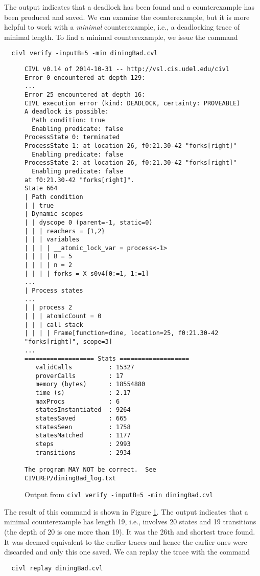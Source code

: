 The output indicates that a deadlock has been found and a
counterexample has been produced and saved. We can examine the
counterexample, but it is more helpful to work with a \emph{minimal}
counterexample, i.e., a deadlocking trace of minimal length. To find a
minimal counterexample, we issue the command

\begin{verbatim}
  civl verify -inputB=5 -min diningBad.cvl
\end{verbatim}

\begin{figure}[t]
  \begin{small}
\begin{verbatim}
CIVL v0.14 of 2014-10-31 -- http://vsl.cis.udel.edu/civl
Error 0 encountered at depth 129:
...
Error 25 encountered at depth 16:
CIVL execution error (kind: DEADLOCK, certainty: PROVEABLE)
A deadlock is possible:
  Path condition: true
  Enabling predicate: false
ProcessState 0: terminated
ProcessState 1: at location 26, f0:21.30-42 "forks[right]"
  Enabling predicate: false
ProcessState 2: at location 26, f0:21.30-42 "forks[right]"
  Enabling predicate: false
at f0:21.30-42 "forks[right]".
State 664
| Path condition
| | true
| Dynamic scopes
| | dyscope 0 (parent=-1, static=0)
| | | reachers = {1,2}
| | | variables
| | | | __atomic_lock_var = process<-1>
| | | | B = 5
| | | | n = 2
| | | | forks = X_s0v4[0:=1, 1:=1]
...
| Process states
...
| | process 2
| | | atomicCount = 0
| | | call stack
| | | | Frame[function=dine, location=25, f0:21.30-42 "forks[right]", scope=3]
...
=================== Stats ===================
   validCalls          : 15327
   proverCalls         : 17
   memory (bytes)      : 18554880
   time (s)            : 2.17
   maxProcs            : 6
   statesInstantiated  : 9264
   statesSaved         : 665
   statesSeen          : 1758
   statesMatched       : 1177
   steps               : 2993
   transitions         : 2934

The program MAY NOT be correct.  See CIVLREP/diningBad_log.txt
\end{verbatim}
  \end{small}
  \caption{Output from \texttt{civl verify -inputB=5 -min diningBad.cvl}}
  \label{fig:diningOut}
\end{figure}

The result of this command is shown in Figure \ref{fig:diningOut}. The
output indicates that a minimal counterexample has length 19, i.e.,
involves 20 states and 19 transitions (the depth of 20 is one more
than 19).    It was the 26th and shortest trace found.  It was deemed
equivalent to the earlier traces and hence the earlier ones were
discarded and only this one saved.  We can replay the trace with the command
\begin{verbatim}
  civl replay diningBad.cvl
\end{verbatim}

